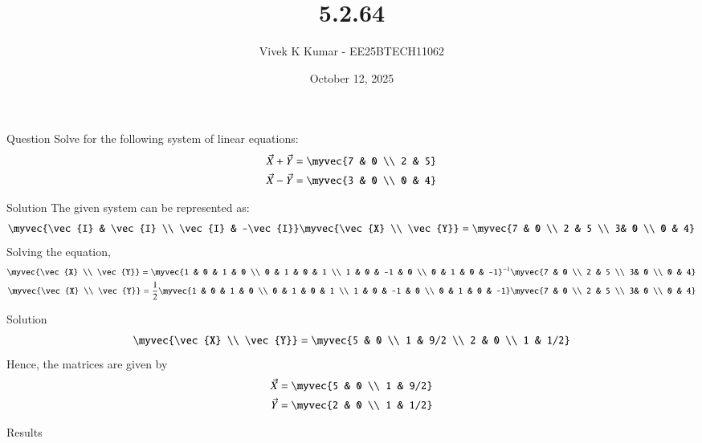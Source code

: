 \documentclass{beamer}
\title 
{5.2.64}
\date{October 12, 2025}
\author 
{Vivek K Kumar - EE25BTECH11062}
\begin{document}
\frame{\titlepage}
\begin{frame}{Question}
Solve for the following system of linear equations:
\begin{align*}
\vec{X} + \vec{Y} = \myvec{7 & 0 \\ 2 & 5}\\
\vec{X} - \vec{Y} = \myvec{3 & 0 \\ 0 & 4}\\
\end{align*}
\end{frame}

\begin{frame}{Solution}
The given system can be represented as:
\begin{align}
    \myvec{\vec{I} & \vec{I} \\ \vec{I} & -\vec{I}}\myvec{\vec{X} \\ \vec{Y}} = \myvec{7 & 0 \\ 2 & 5 \\ 3& 0 \\ 0 & 4} 
\end{align}
Solving the equation,
\begin{align}
    \myvec{\vec{X} \\ \vec{Y}} = \myvec{1 & 0 & 1 & 0 \\ 0 & 1 & 0 & 1 \\ 1 & 0 & -1 & 0 \\ 0 & 1 & 0 & -1} ^{-1} \myvec{7 & 0 \\ 2 & 5 \\ 3& 0 \\ 0 & 4} \\
    \myvec{\vec{X} \\ \vec{Y}} = \frac{1}{2}\myvec{1 & 0 & 1 & 0 \\ 0 & 1 & 0 & 1 \\ 1 & 0 & -1 & 0 \\ 0 & 1 & 0 & -1} \myvec{7 & 0 \\ 2 & 5 \\ 3& 0 \\ 0 & 4}
\end{align}
\end{frame}
\begin{frame}{Solution}
\begin{align}
     \myvec{\vec{X} \\ \vec{Y}} = \myvec{5 & 0 \\ 1 & 9/2 \\ 2 & 0 \\ 1 & 1/2}
\end{align}
Hence, the matrices are given by
\begin{align}
    \vec{X} = \myvec{5 & 0 \\ 1 & 9/2}\\
    \vec{Y} = \myvec{2 & 0 \\ 1 & 1/2}
\end{align}
\end{frame}

\begin{frame}{Results}
\begin{table}[H]    
  \centering
  
  \caption{Results}
  \label{tab:5.2.64}
\end{table}

\end{frame}
\end{document}
